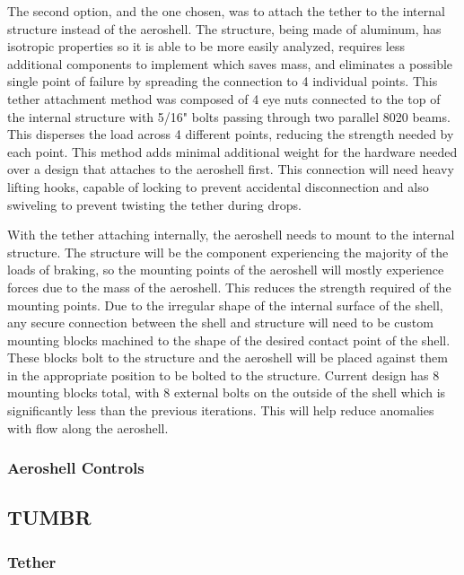 The second option, and the one chosen, was to attach the tether to the internal structure instead of the aeroshell. The structure, being made of aluminum, has isotropic properties so it is able to be more easily analyzed, requires less additional components to implement which saves mass, and eliminates a possible single point of failure by spreading the connection to 4 individual points. This tether attachment method was composed of 4 eye nuts connected to the top of the internal structure with 5/16" bolts passing through two parallel 8020 beams. This disperses the load across 4 different points, reducing the strength needed by each point. This method adds minimal additional weight for the hardware needed over a design that attaches to the aeroshell first. This connection will need heavy lifting hooks, capable of locking to prevent accidental disconnection and also swiveling to prevent twisting the tether during drops.

With the tether attaching internally, the aeroshell needs to mount to the internal structure. The structure will be the component experiencing the majority of the loads of braking, so the mounting points of the aeroshell will mostly experience forces due to the mass of the aeroshell. This reduces the strength required of the mounting points. Due to the irregular shape of the internal surface of the shell, any secure connection between the shell and structure will need to be custom mounting blocks machined to the shape of the desired contact point of the shell. These blocks bolt to the structure and the aeroshell will be placed against them in the appropriate position to be bolted to the structure. Current design has 8 mounting blocks total, with 8 external bolts on the outside of the shell which is significantly less than the previous iterations. This will help reduce anomalies with flow along the aeroshell.

\subsubsection{Aeroshell Controls}


\subsection{TUMBR}

\subsubsection{Tether}

